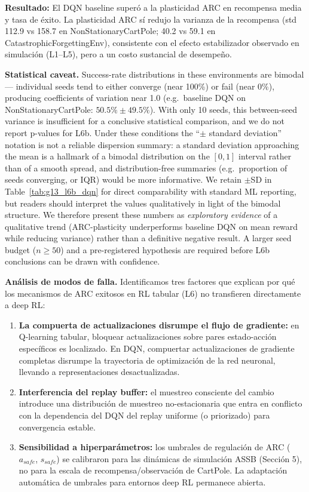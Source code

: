 \documentclass{article}
\begin{document}
\textbf{Resultado:} El DQN baseline superó a la plasticidad ARC en recompensa media y tasa de éxito. La plasticidad ARC sí redujo la varianza de la recompensa (std 112.9 vs 158.7 en NonStationaryCartPole; 40.2 vs 59.1 en CatastrophicForgettingEnv), consistente con el efecto estabilizador observado en simulación (L1--L5), pero a un costo sustancial de desempeño.

\textbf{Statistical caveat.} Success-rate distributions in these environments are bimodal --- individual seeds tend to either converge (near 100\%) or fail (near 0\%), producing coefficients of variation near 1.0 (e.g.\ baseline DQN on NonStationaryCartPole: $50.5\% \pm 49.5\%$). With only 10 seeds, this between-seed variance is insufficient for a conclusive statistical comparison, and we do not report p-values for L6b. Under these conditions the ``$\pm$ standard deviation'' notation is not a reliable dispersion summary: a standard deviation approaching the mean is a hallmark of a bimodal distribution on the $[0,1]$ interval rather than of a smooth spread, and distribution-free summaries (e.g.\ proportion of seeds converging, or IQR) would be more informative. We retain $\pm$SD in Table~\ref{tab:g13_l6b_dqn} for direct comparability with standard ML reporting, but readers should interpret the values qualitatively in light of the bimodal structure. We therefore present these numbers as \emph{exploratory evidence} of a qualitative trend (ARC-plasticity underperforms baseline DQN on mean reward while reducing variance) rather than a definitive negative result. A larger seed budget ($n \ge 50$) and a pre-registered hypothesis are required before L6b conclusions can be drawn with confidence.

\textbf{Análisis de modos de falla.} Identificamos tres factores que explican por qué los mecanismos de ARC exitosos en RL tabular (L6) no transfieren directamente a deep RL:
\begin{enumerate}
    \item \textbf{La compuerta de actualizaciones disrumpe el flujo de gradiente:} en Q-learning tabular, bloquear actualizaciones sobre pares estado-acción específicos es localizado. En DQN, compuertar actualizaciones de gradiente completas disrumpe la trayectoria de optimización de la red neuronal, llevando a representaciones desactualizadas.
    \item \textbf{Interferencia del replay buffer:} el muestreo consciente del cambio introduce una distribución de muestreo no-estacionaria que entra en conflicto con la dependencia del DQN del replay uniforme (o priorizado) para convergencia estable.
    \item \textbf{Sensibilidad a hiperparámetros:} los umbrales de regulación de ARC ($a_{safe}$, $s_{safe}$) se calibraron para las dinámicas de simulación ASSB (Sección 5), no para la escala de recompensa/observación de CartPole. La adaptación automática de umbrales para entornos deep RL permanece abierta.
\end{enumerate}
\end{document}
